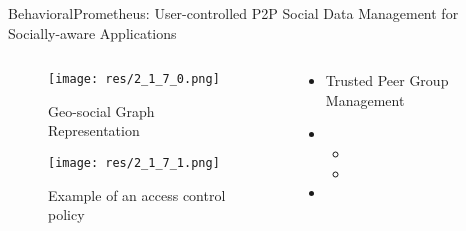 \begin{frame}{Behavioral}{Prometheus: User-controlled P2P Social Data Management for Socially-aware Applications \cite{kourtellis_prometheus_2010}}

	\begin{columns}
		\begin{column}{0.5\textwidth}
			\begin{center}
			
				\begin{figure}
					\texttt{[image: res/2\_1\_7\_0.png]}
					\caption{\label{fig:2_1_7_0}Geo-social Graph Representation}
					
					\texttt{[image: res/2\_1\_7\_1.png]}
					\caption{\label{fig:2_1_7_1}Example of an access control policy}
				\end{figure}
				
			\end{center}
		\end{column}
		
		\begin{column}{0.5\textwidth}
		
			\begin{itemize}
				\item Trusted Peer Group Management
				
				\item 
					\begin{itemize}
						\item 
						\item 
					\end{itemize}
				
				\item 
			\end{itemize}
			
		\end{column}
	\end{columns}
	

\end{frame}

